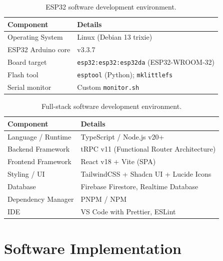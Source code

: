 \begin{table}[H]
	\centering
	\caption{ESP32 software development environment.}
	\label{tab:dev_env}
	\begin{tabularx}{\linewidth}{lX}
		\toprule
		\textbf{Component} & \textbf{Details}                               \\
		\midrule
		Operating System   & Linux (Debian 13 trixie)                       \\
		ESP32 Arduino core & v3.3.7                                          \\
		Board target       & \texttt{esp32:esp32:esp32da} (ESP32-WROOM-32)  \\
		Flash tool         & \texttt{esptool} (Python); \texttt{mklittlefs} \\
		Serial monitor     & Custom \texttt{monitor.sh}                     \\
		\bottomrule
	\end{tabularx}
\end{table}

\begin{table}[H]
	\centering
	\caption{Full-stack software development environment.}
	\label{tab:backend_dev_env}
	\begin{tabularx}{\linewidth}{lX}
		\toprule
		\textbf{Component} & \textbf{Details}                               \\
		\midrule
		Language / Runtime & TypeScript / Node.js v20+                       \\
		Backend Framework  & tRPC v11 (Functional Router Architecture)      \\
		Frontend Framework & React v18 + Vite (SPA)                         \\
		Styling / UI       & TailwindCSS + Shadcn UI + Lucide Icons         \\
		Database           & Firebase Firestore, Realtime Database         \\
		Dependency Manager & PNPM / NPM                                     \\
		IDE                & VS Code with Prettier, ESLint                 \\
		\bottomrule
	\end{tabularx}
\end{table}

\section{Software Implementation}

